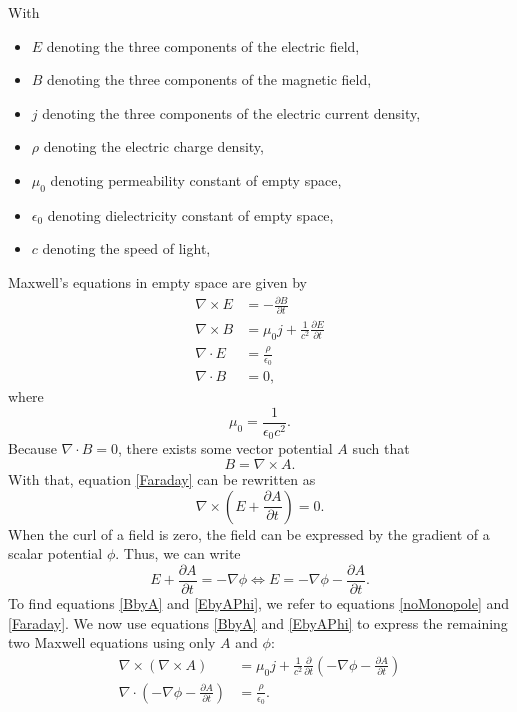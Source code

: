 \documentclass[prb,preprint]{revtex4-1}
\begin{document}
With
\begin{itemize}
  \item $E$ denoting the three components of the electric field,
  \item $B$ denoting the three components of the magnetic field,
  \item $j$ denoting the three components of the electric current density,
  \item $\rho$ denoting the electric charge density,
  \item $\mu_0$ denoting permeability constant of empty space,
  \item $\epsilon_0$ denoting dielectricity constant of empty space,
  \item $c$ denoting the speed of light,
\end{itemize}
Maxwell's equations in empty space are given by
\begin{align}
\nabla \times E &= - \frac{\partial B}{\partial t} \label{Faraday} \\
\nabla \times B &= \mu_0 j +  \frac{1}{c^2} \frac{\partial E}{\partial t} \\
\nabla \cdot E &= \frac{\rho}{\epsilon_0} \\
\nabla \cdot B &= 0, \label{noMonopole}
\end{align}
where
\begin{equation}
\mu_0 = \frac{1}{\epsilon_0 c^2}.
\end{equation}
Because $\nabla \cdot B = 0$, there exists some vector potential $A$ such that
\begin{equation} \label{BbyA}
B = \nabla \times A.
\end{equation}
With that, equation \eqref{Faraday} can be rewritten as
\begin{equation}
\nabla \times \left( E + \frac{\partial A}{\partial t} \right) = 0.
\end{equation}
When the curl of a field is zero, the field can be expressed by the gradient of a scalar potential $\phi$. Thus, we can write
\begin{equation} \label{EbyAPhi}
E + \frac{\partial A}{\partial t} = - \nabla \phi
\iff
E = - \nabla \phi - \frac{\partial A}{\partial t}.
\end{equation}
To find equations \eqref{BbyA} and \eqref{EbyAPhi}, we refer to equations \eqref{noMonopole} and \eqref{Faraday}.
We now use equations \eqref{BbyA} and \eqref{EbyAPhi} to express the remaining two Maxwell equations using only $A$ and $\phi$:
\begin{align}
\nabla \times ( \nabla \times A) &= \mu_0 j + \frac{1}{c^2} \frac{\partial}{\partial t} \left(- \nabla \phi - \frac{\partial A}{\partial t} \right) \label{MaxwellAPhi1} \\
\nabla \cdot \left( -\nabla \phi - \frac{\partial A}{\partial t} \right) &= \frac{\rho}{\epsilon_0} . \label{MaxwellAPhi2}
\end{align}
\end{document}
